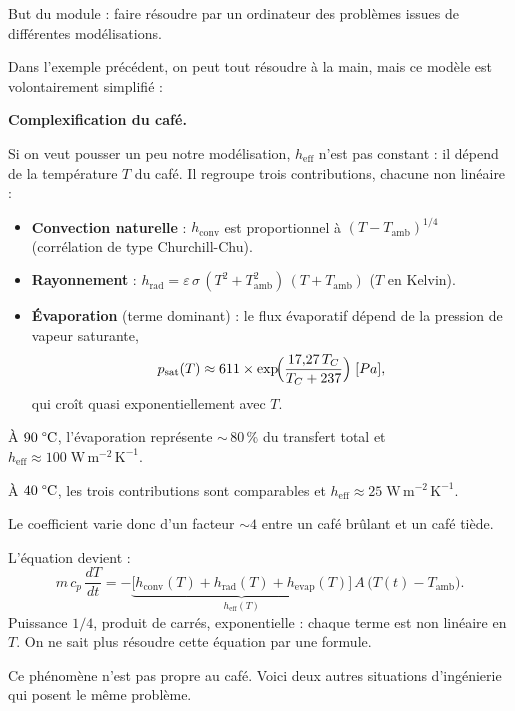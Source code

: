 But du module : faire résoudre par un ordinateur des problèmes issues de différentes modélisations. 

Dans l'exemple précédent, on peut tout résoudre à la main, mais ce modèle est volontairement simplifié :

\medskip

\textbf{Complexification du café.}

Si on veut pousser un peu notre modélisation, $h_{\mathrm{eff}}$ n'est pas constant :
il dépend de la température $T$ du café.
Il regroupe trois contributions, chacune non linéaire :

\begin{itemize}[leftmargin=*]
  \item \textbf{Convection naturelle} :
    $h_{\mathrm{conv}}$ est proportionnel à $(T - T_{\mathrm{amb}})^{1/4}$
    \qquad (corrélation de type Churchill-Chu).
  \item \textbf{Rayonnement} :
    $h_{\mathrm{rad}}
    = \varepsilon\,\sigma\,(T^2+T_{\mathrm{amb}}^2)\,(T+T_{\mathrm{amb}})$
    \qquad ($T$ en Kelvin).
  \item \textbf{Évaporation} (terme dominant) :
    le flux évaporatif dépend de la pression
    de vapeur saturante,
    $$p_{\mathrm{sat}}(T)
    \approx 611 \times
    \exp\!\Bigl(\dfrac{17{,}27\,T_C}{T_C+237}\Bigr)
    \;[Pa],$$
    qui croît quasi exponentiellement avec $T$.
\end{itemize}

\smallskip

À $90\;\text{\textdegree C}$, l'évaporation représente
${\sim}\,80\,\%$ du transfert total
et $h_{\mathrm{eff}} \approx 100\;\mathrm{W\,m^{-2}\,K^{-1}}$.

À $40\;\text{\textdegree C}$, les trois contributions sont comparables
et $h_{\mathrm{eff}} \approx 25\;\mathrm{W\,m^{-2}\,K^{-1}}$.

Le coefficient varie donc d'un facteur $\sim\!4$
entre un café brûlant et un café tiède.

\smallskip

L'équation devient :
\[
  m\,c_p\,\frac{dT}{dt}
  = -\underbrace{\bigl[h_{\mathrm{conv}}(T)
    + h_{\mathrm{rad}}(T)
    + h_{\mathrm{evap}}(T)\bigr]}_{h_{\mathrm{eff}}(T)}
  \,A\,\bigl(T(t) - T_{\mathrm{amb}}\bigr).
\]
Puissance $1/4$, produit de carrés, exponentielle :
chaque terme est non linéaire en $T$.
On ne sait plus résoudre cette équation par une formule.

\medskip

Ce phénomène n'est pas propre au café.
Voici deux autres situations d'ingénierie
qui posent le même problème.

